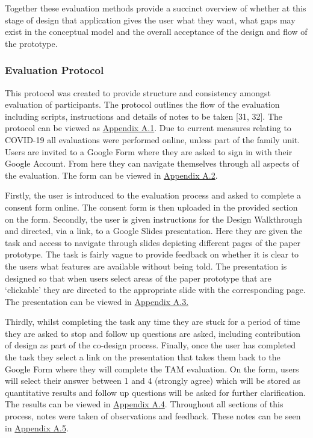 \documentclass[a4 paper, 12pt]{article}
\begin{document}
Together these evaluation methods provide a succinct overview of whether at this stage of design that application gives the user what they want, what gaps may exist in the conceptual model and the overall acceptance of the design and flow of the prototype.

\subsubsection{Evaluation Protocol}
This protocol was created to provide structure and consistency amongst evaluation of participants. The protocol outlines the flow of the evaluation including scripts, instructions and details of notes to be taken [31, 32]. The protocol can be viewed as \hyperref[sec:A.1]{Appendix A.1}. Due to current measures relating to COVID-19 all evaluations were performed online, unless part of the family unit. Users are invited to a Google Form where they are asked to sign in with their Google Account. From here they can navigate themselves through all aspects of the evaluation. The form can be viewed in \hyperref[sec:A.2]{Appendix A.2}.  

Firstly, the user is introduced to the evaluation process and asked to complete a consent form online. The consent form is then uploaded in the provided section on the form. Secondly, the user is given instructions for the Design Walkthrough and directed, via a link, to a Google Slides presentation. Here they are given the task and access to navigate through slides depicting different pages of the paper prototype. The task is fairly vague to provide feedback on whether it is clear to the users what features are available without being told. The presentation is designed so that when users select areas of the paper prototype that are ‘clickable’ they are directed to the appropriate slide with the corresponding page. The presentation can be viewed in \hyperref[sec:A.3]{Appendix A.3.}

Thirdly, whilst completing the task any time they are stuck for a period of time they are asked to stop and follow up questions are asked, including contribution of design as part of the co-design process. Finally, once the user has completed the task they select a link on the presentation that takes them back to the Google Form where they will complete the TAM evaluation. On the form, users will select their answer between 1 and 4 (strongly agree) which will be stored as quantitative results and follow up questions will be asked for further clarification. The results can be viewed in \hyperref[sec:A.4]{Appendix A.4}. Throughout all sections of this process, notes were taken of observations and feedback. These notes can be seen in \hyperref[sec:A.5]{Appendix A.5}.
\end{document}
